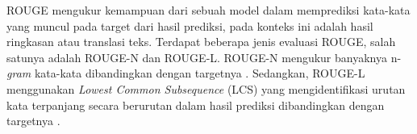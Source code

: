 ROUGE mengukur kemampuan dari sebuah model dalam memprediksi kata-kata yang muncul pada target dari hasil prediksi, pada konteks ini adalah hasil ringkasan atau translasi teks. Terdapat beberapa jenis evaluasi ROUGE, salah satunya adalah ROUGE-N dan ROUGE-L. ROUGE-N mengukur banyaknya n-\textit{gram} kata-kata dibandingkan dengan targetnya \parencite{rouge}. Sedangkan, ROUGE-L menggunakan \textit{Lowest Common Subsequence} (LCS) yang mengidentifikasi urutan kata terpanjang secara berurutan dalam hasil prediksi dibandingkan dengan targetnya \parencite{rouge}.
